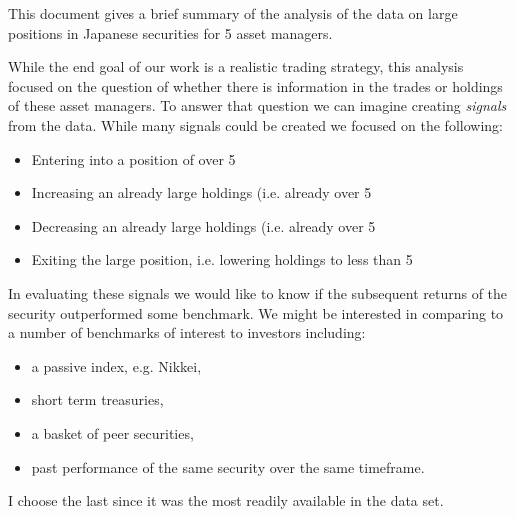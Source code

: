 \documentclass{article}
\begin{document}
This document gives a 
brief summary of the analysis 
of the data on large positions in Japanese securities for 5 asset managers.
  
While the end goal of our work is a realistic trading strategy, this analysis focused on the question of whether there is information in the trades or holdings of these asset managers.  To answer that question we can imagine creating \emph{signals} from the data.  While many signals could be created we focused on the following:
\begin{itemize}
\item Entering into a position of over 5%
\item Increasing an already large holdings (i.e. already over 5%
\item Decreasing an already large holdings (i.e. already over 5%
\item Exiting the large position, i.e. lowering holdings to less than 5%
\end{itemize}

In evaluating these signals we would like to know if the subsequent returns of the security outperformed some benchmark. We might be interested in comparing to a number of benchmarks of interest to investors including:
\begin{itemize}
\item a passive index, e.g. Nikkei,
\item short term treasuries,
\item a basket of peer securities,
\item past performance of the same security over the same timeframe.
\end{itemize}

I choose the last since it was the most readily available in the data set.
\end{document}
